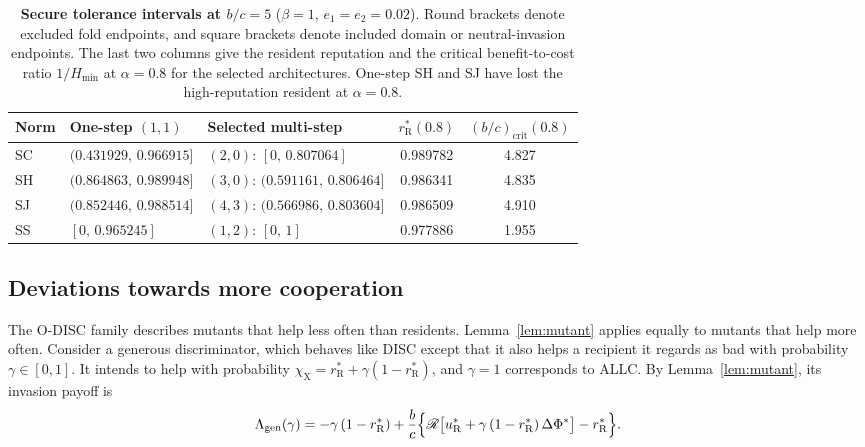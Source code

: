 \documentclass[10pt]{wlscirep}
\newif\ifdraftnotes
\DeclareRobustCommand{\draftnote}[1]{%
  \ifdraftnotes{\color{red!60!black}\sffamily\footnotesize[#1]}\fi}
\newcommand{\Rmap}{\mathscr{R}}            %
\newcommand{\rR}{r_{\mathrm{R}}^{*}}
\newcommand{\uR}{u_{\mathrm{R}}^{*}}
\newcommand{\dPhi}{\Delta\Phi^{*}}
\newcommand{\Hmin}{H_{\min}}
\theoremstyle{plain}
\theoremstyle{remark}
\begin{document}
\begin{table}[!htbp]
\centering
\caption{\textbf{Secure tolerance intervals at $b/c=5$} ($\beta=1$, $e_1=e_2=0.02$). Round brackets denote excluded fold endpoints, and square brackets denote included domain or neutral-invasion endpoints. The last two columns give the resident reputation and the critical benefit-to-cost ratio $1/\Hmin$ at $\alpha=0.8$ for the selected architectures. One-step SH and SJ have lost the high-reputation resident at $\alpha=0.8$.}
\label{tab:si-secure}
\small
\begin{tabular}{@{}lllcc@{}}
\toprule
Norm & One-step $(1,1)$ & Selected multi-step & $\rR(0.8)$ & $(b/c)_{\mathrm{crit}}(0.8)$\\
\midrule
SC & $(0.431929,\,0.966915]$ & $(2,0)$: $[0,\,0.807064]$ & 0.989782 & 4.827\\
SH & $(0.864863,\,0.989948]$ & $(3,0)$: $(0.591161,\,0.806464]$ & 0.986341 & 4.835\\
SJ & $(0.852446,\,0.988514]$ & $(4,3)$: $(0.566986,\,0.803604]$ & 0.986509 & 4.910\\
SS & $[0,\,0.965245]$ & $(1,2)$: $[0,\,1]$ & 0.977886 & 1.955\\
\bottomrule
\end{tabular}
\end{table}

\subsection{Deviations towards more cooperation}
\label{si:generous}
\draftnote{New in revision 3. The numbers in Supplementary Table~\ref{tab:si-generous} are a mean-field calculation that is not yet part of the verified package.}

The O-DISC family describes mutants that help less often than residents. Lemma~\ref{lem:mutant} applies equally to mutants that help more often. Consider a generous discriminator, which behaves like DISC except that it also helps a recipient it regards as bad with probability $\gamma\in[0,1]$. It intends to help with probability $\chi_{\mathrm X}=\rR+\gamma(1-\rR)$, and $\gamma=1$ corresponds to ALLC. By Lemma~\ref{lem:mutant}, its invasion payoff is
\begin{equation}
\Lambda_{\mathrm{gen}}(\gamma)=-\gamma\,(1-\rR)+\frac{b}{c}\Bigl\{\Rmap\bigl[\uR+\gamma\,(1-\rR)\,\dPhi\bigr]-\rR\Bigr\}.
\label{eq:s-generous}
\end{equation}
\end{document}
